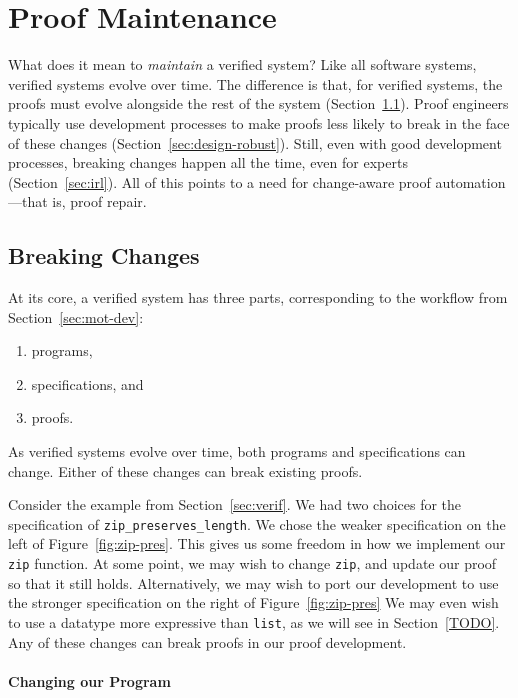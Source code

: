 \section{Proof Maintenance}
\label{sec:mot-mai}

What does it mean to \textit{maintain} a verified system?
Like all software systems, verified systems evolve over time.
The difference is that, for verified systems, the proofs must evolve alongside the rest of the system (Section~\ref{sec:changes}).
Proof engineers typically use development processes to make proofs less likely to break in the 
face of these changes (Section~\ref{sec:design-robust}).
Still, even with good development processes, breaking changes happen all the time, even for experts (Section~\ref{sec:irl}).
All of this points to a need for change-aware proof automation---that is, proof repair.

\subsection{Breaking Changes}
\label{sec:changes}

At its core, a verified system has three parts, corresponding to the workflow from Section~\ref{sec:mot-dev}:

\begin{enumerate}
\item programs,
\item specifications, and
\item proofs.
\end{enumerate}
As verified systems evolve over time, both programs and specifications can change.
Either of these changes can break existing proofs.

Consider the example from Section~\ref{sec:verif}.
We had two choices for the specification of \lstinline{zip_preserves_length}.
We chose the weaker specification on the left of Figure~\ref{fig:zip-pres}.
This gives us some freedom in how we implement our \lstinline{zip} function.
At some point, we may wish to change \lstinline{zip}, and update our proof so that it still holds.
Alternatively, we may wish to port our development to use the stronger specification on the right of Figure~\ref{fig:zip-pres}
We may even wish to use a datatype more expressive than \lstinline{list}, as we will see in Section~\ref{TODO}. %
Any of these changes can break proofs in our proof development.

\paragraph{Changing our Program}

